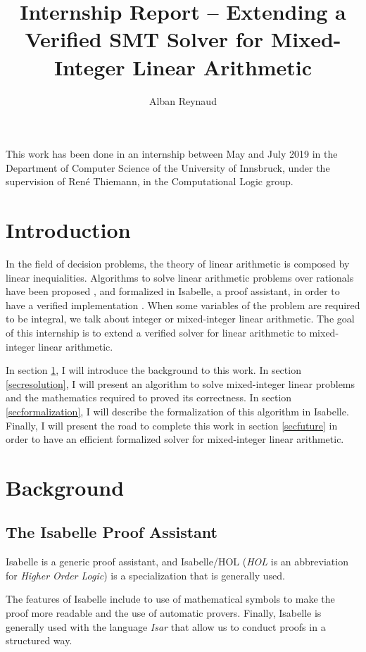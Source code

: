 \documentclass{article}
\title{Internship Report -- Extending a Verified SMT Solver for Mixed-Integer
Linear Arithmetic}
\author{Alban Reynaud}
\date{}
\begin{document}
\maketitle

This work has been done in an internship between May and July 2019
in the Department of Computer Science
of the University of Innsbruck, under the supervision of René Thiemann, in the
Computational Logic group.

\tableofcontents

\pagebreak

\section*{Introduction}
In the field of decision problems, the theory of linear arithmetic is
composed by linear inequialities. Algorithms to solve linear arithmetic
problems over rationals have been proposed \cite{Dutertre2006},
and formalized in Isabelle, a proof assistant, in order to have a verified
implementation \cite{Spasic2012, BHT2019, Thiemann2018}. When some variables of
the problem are required to be integral, we talk about integer or mixed-integer
linear arithmetic. The goal of this internship is to extend a verified solver
for linear arithmetic to mixed-integer linear arithmetic.

In section \ref{secback}, I will introduce the background to
this work. In section \ref{secresolution}, I will present an algorithm to solve
mixed-integer linear problems and the mathematics required to proved its
correctness.
In section \ref{secformalization}, I will describe the formalization of this
algorithm in Isabelle. Finally, I will present the road to complete this work
in section \ref{secfuture} in order to have an efficient formalized solver for
mixed-integer linear arithmetic.

\section{Background}
\label{secback}

\subsection{The Isabelle Proof Assistant}
Isabelle \cite{Isabelle} is a generic proof assistant, and Isabelle/HOL
(\textit{HOL} is an abbreviation for \textit{Higher Order Logic}) is a
specialization that is generally used.

The features of Isabelle include to use of mathematical symbols to make the
proof more readable and the use of automatic provers.
Finally, Isabelle is generally used with the language \textit{Isar} that allow
us to conduct proofs in a structured way.
\end{document}
